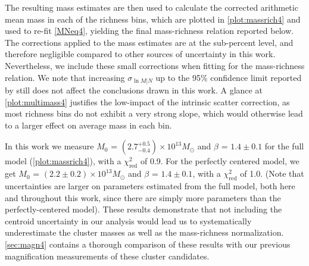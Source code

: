 The resulting mass estimates are then used to calculate the corrected arithmetic mean mass in each of the richness bins, which are plotted in \autoref{plot:massrich4} and used to re-fit \autoref{MNeq4}, yielding the final mass-richness relation reported below. The corrections applied to the mass estimates are at the sub-percent level, and therefore negligible compared to other sources of uncertainty in this work. Nevertheless, we include these small corrections when fitting for the mass-richness relation. We note that increasing $\sigma_{\ln M|N}$ up to the 95\% confidence limit reported by \citet{Rozo09a} still does not affect the conclusions drawn in this work. A glance at \autoref{plot:multimass4} justifies the low-impact of the intrinsic scatter correction, as most richness bins do not exhibit a very strong slope, which would otherwise lead to a larger effect on average mass in each bin.

In this work we measure $M_0$ = $(2.7^{+0.5}_{-0.4}) \times 10^{13} M_{\odot}$ and $\beta$ = $1.4 \pm 0.1$ for the full model (\autoref{plot:massrich4}), with a $\chi^2_{\mathrm{red}}$ of 0.9. For the perfectly centered model, we get $M_0$ = $(2.2 \pm 0.2) \times 10^{13} M_{\odot}$ and $\beta$ = $1.4 \pm 0.1$, with a $\chi^2_{\mathrm{red}}$ of 1.0. (Note that uncertainties are larger on parameters estimated from the full model, both here and throughout this work, since there are simply more parameters than the perfectly-centered model). These results demonstrate that not including the centroid uncertainty in our analysis would lead us to systematically underestimate the cluster masses as well as the mass-richness normalization. \autoref{sec:magn4} contains a thorough comparison of these results with our previous magnification measurements of these cluster candidates.



